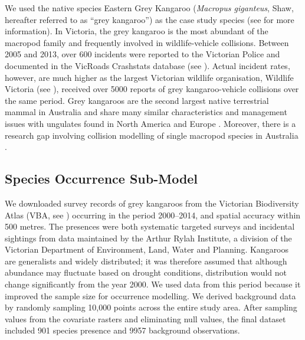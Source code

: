 We used the native species Eastern Grey Kangaroo (\textit{Macropus giganteus}, Shaw, hereafter referred to as “grey kangaroo”) as the case study species (see  for more information). In Victoria, the grey kangaroo is the most abundant of the macropod family and frequently involved in wildlife-vehicle collisions. Between 2005 and 2013, over 600 incidents were reported to the Victorian Police and documented in the VicRoads Crashstats database (see ). Actual incident rates, however, are much higher as the largest Victorian wildlife organisation, Wildlife Victoria (see ), received over 5000 reports of grey kangaroo-vehicle collisions over the same period. Grey kangaroos are the second largest native terrestrial mammal in Australia and share many similar characteristics and management issues with ungulates found in North America and Europe \citep{crof04,coul10}. Moreover, there is a research gap involving collision modelling of single macropod species in Australia \citep{bond14}.

\subsection{Species Occurrence Sub-Model}

We downloaded survey records of grey kangaroos from the Victorian Biodiversity Atlas (VBA, see ) occurring in the period 2000--2014, and spatial accuracy within 500 metres. The presences were both systematic targeted surveys and incidental sightings from data maintained by the Arthur Rylah Institute, a division of the Victorian Department of Environment, Land, Water and Planning.  Kangaroos are generalists and widely distributed; it was therefore assumed that although abundance may fluctuate based on drought conditions, distribution would not change significantly from the year 2000.  We used data from this period because it improved the sample size for occurrence modelling.  We derived background data by randomly sampling 10,000 points across the entire study area.  After sampling values from the covariate rasters and eliminating null values, the final dataset included 901 species presence and 9957 background observations.

